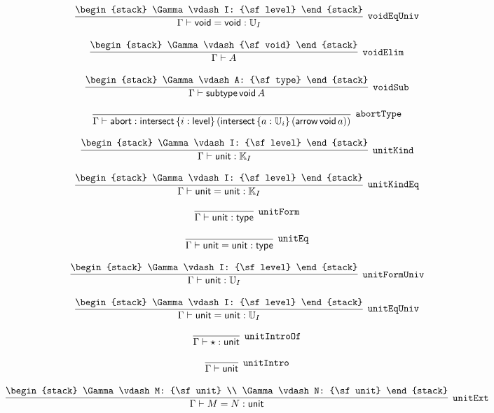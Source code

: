 \[
\infer[{\tt voidEqUniv}]{\Gamma \vdash {\sf void}= {\sf void}: {\Bbb U}_{I}}{
\begin{stack}
\Gamma \vdash I: {\sf level}
\end{stack}}
\]

\[
\infer[{\tt voidElim}]{\Gamma \vdash A}{
\begin{stack}
\Gamma \vdash {\sf void}
\end{stack}}
\]

\[
\infer[{\tt voidSub}]{\Gamma \vdash {\sf subtype}\,{\sf void}\,A}{
\begin{stack}
\Gamma \vdash A: {\sf type}
\end{stack}}
\]

\[
\infer[{\tt abortType}]{\Gamma \vdash {\sf abort}: {\sf intersect}\,\{i : {\sf level}\}\,({\sf intersect}\,\{a : {\Bbb U}_{i}\}\,({\sf arrow}\,{\sf void}\,a))}{}
\]

\[
\infer[{\tt unitKind}]{\Gamma \vdash {\sf unit}: {\Bbb K}_{I}}{
\begin{stack}
\Gamma \vdash I: {\sf level}
\end{stack}}
\]

\[
\infer[{\tt unitKindEq}]{\Gamma \vdash {\sf unit}= {\sf unit}: {\Bbb K}_{I}}{
\begin{stack}
\Gamma \vdash I: {\sf level}
\end{stack}}
\]

\[
\infer[{\tt unitForm}]{\Gamma \vdash {\sf unit}: {\sf type}}{}
\]

\[
\infer[{\tt unitEq}]{\Gamma \vdash {\sf unit}= {\sf unit}: {\sf type}}{}
\]

\[
\infer[{\tt unitFormUniv}]{\Gamma \vdash {\sf unit}: {\Bbb U}_{I}}{
\begin{stack}
\Gamma \vdash I: {\sf level}
\end{stack}}
\]

\[
\infer[{\tt unitEqUniv}]{\Gamma \vdash {\sf unit}= {\sf unit}: {\Bbb U}_{I}}{
\begin{stack}
\Gamma \vdash I: {\sf level}
\end{stack}}
\]

\[
\infer[{\tt unitIntroOf}]{\Gamma \vdash \star : {\sf unit}}{}
\]

\[
\infer[{\tt unitIntro}]{\Gamma \vdash {\sf unit}}{}
\]

\[
\infer[{\tt unitExt}]{\Gamma \vdash M= N: {\sf unit}}{
\begin{stack}
\Gamma \vdash M: {\sf unit}
\\
\Gamma \vdash N: {\sf unit}
\end{stack}}
\]

